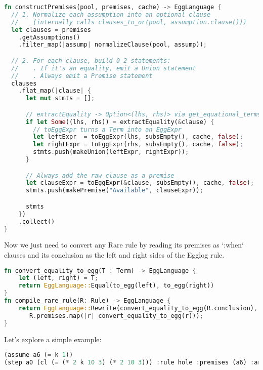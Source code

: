 \documentclass{article}
\begin{document}
\begin{lstlisting}[language=Rust]
fn constructPremises(pool, premises, cache) -> EggLanguage {
  // 1. Normalize each assumption into an optional clause
  //    (internally calls clauses_to_or(pool, assumption.clause()))
  let clauses = premises
    .getAssumptions()
    .filter_map(|assump| normalizeClause(pool, assump));

  // 2. For each clause, build 0-2 statements:
  //    . If it's an equality, emit a Union statement
  //    . Always emit a Premise statement
  clauses
    .flat_map(|clause| {
      let mut stmts = [];

      // extractEquality -> Option<(lhs, rhs)> via get_equational_terms
      if let Some((lhs, rhs)) = extractEquality(&clause) {
        // toEggExpr turns a Term into an EggExpr
        let leftExpr  = toEggExpr(lhs, subsEmpty(), cache, false);
        let rightExpr = toEggExpr(rhs, subsEmpty(), cache, false);
        stmts.push(makeUnion(leftExpr, rightExpr));
      }

      // Always add the raw clause as a premise
      let clauseExpr = toEggExpr(&clause, subsEmpty(), cache, false);
      stmts.push(makePremise("Available", clauseExpr));

      stmts
    })
    .collect()
}
\end{lstlisting}

Now we just need to convert any Rare rule by reading its premises as `:when` clauses and its conclusion as the left and right sides of the Egglog rule. 

\begin{lstlisting}[language=Rust]
fn convert_equality_to_egg(T : Term) -> EggLanguage {
    let (left, right) = T;
    return EggLanguage::Equal(to_egg(left), to_egg(right))
}
fn compile_rare_rule(R: Rule) -> EggLanguage {
    return EggLanguage::Rewrite(convert_equality_to_egg(R.conclusion), 
       R.premises.map(|r| convert_equality_to_egg(r)));
}
\end{lstlisting}

Let's explore a simple example:

\begin{lstlisting}[language=Rust]
(assume a6 (= k 1))
(step a0 (cl (= (* 2 k 10 3) (* 2 10 3))) :rule hole :premises (a6) :args ("TRUST_THEORY_REWRITE" b))
\end{lstlisting}
\end{document}
